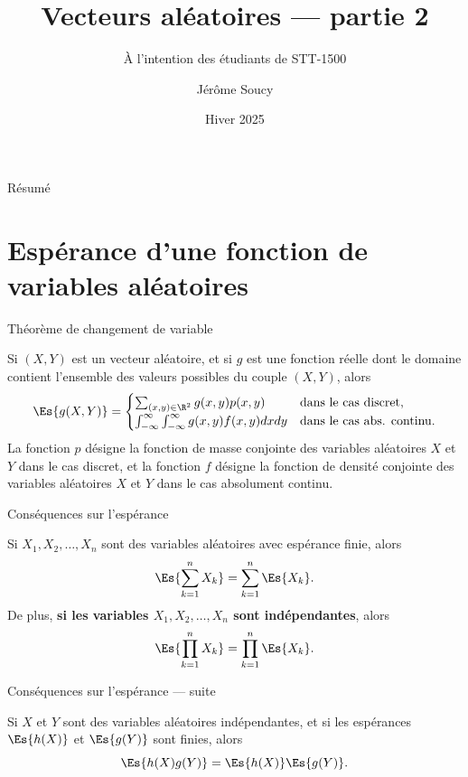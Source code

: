 \documentclass[nuit,charter,pied]{BeamerJS}
\title{Vecteurs aléatoires --- partie 2}
\subtitle{À l'intention des étudiants de STT-1500}
\institute{Université Laval}
\author{Jérôme Soucy}
\date{Hiver 2025}
\begin{document}
\begin{frame}
	\titlepage
\end{frame}

\begin{frame}{Résumé}
\tableofcontents
\end{frame}
\section{Espérance d'une fonction de variables aléatoires}
\begin{frame}{Théorème de changement de variable}
	\pause
	\begin{thm}
		Si $(X,Y)$ est un vecteur aléatoire, et si $g$ est une fonction réelle dont le domaine contient l'ensemble des valeurs possibles du couple $(X,Y)$, alors
		\[\Es{g(X,Y)}=\begin{cases}\sum_{(x,y)\in\R^2}g(x,y)p(x,y)&\text{dans le cas discret,}\\
			\int_{-\infty}^{\infty}\int_{-\infty}^{\infty}g(x,y)f(x,y)dxdy&\text{dans le cas abs. continu.}\\
		\end{cases}\]
		La fonction $p$ désigne la fonction de masse conjointe des variables aléatoires $X$ et $Y$ dans le cas discret, et la fonction $f$ désigne la fonction de densité conjointe des variables aléatoires $X$ et $Y$ dans le cas absolument continu.
	\end{thm}
\end{frame}
\begin{frame}{Conséquences sur l'espérance}
	\pause
	\begin{thm}
		Si $X_1,X_2,\ldots,X_n$ sont des variables aléatoires avec espérance finie, alors
		\[\Es{\sum_{k=1}^nX_k}=\sum_{k=1}^n\Es{X_k}.\]
		De plus, \textbf{si les variables $X_1,X_2,\ldots,X_n$ sont indépendantes}, alors
		\[\Es{\prod_{k=1}^nX_k}=\prod_{k=1}^n\Es{X_k}.\]
	\end{thm}
\end{frame}
\begin{frame}{Conséquences sur l'espérance --- suite}
	\pause
	\begin{thm}
		Si $X$ et $Y$ sont des variables aléatoires indépendantes, et si les espérances $\Es{h(X)}$ et $\Es{g(Y)}$ sont finies, alors
		\[\Es{h(X)g(Y)}=\Es{h(X)}\Es{g(Y)}.\]
	\end{thm}
\end{frame}
\end{document}
